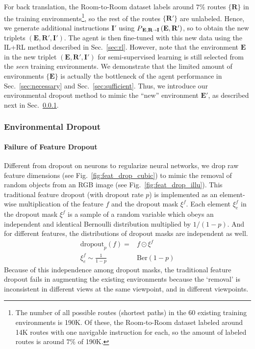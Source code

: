 \documentclass[11pt,a4paper]{article}
\begin{document}
For back translation, the Room-to-Room dataset labels around $7\%$ routes $\{ \mathbf R \}$ in the training environments\footnote{The number of all possible routes (shortest paths) in the $60$ existing training environments is 190K. Of these, the Room-to-Room dataset labeled around 14K routes with one navigable instruction for each, so the amount of labeled routes is around $7\%$ of 190K.}, so the rest of the routes $\{\mathbf{R'}\}$ are unlabeled.
Hence, we generate additional instructions $\mathbf{I'}$ using  $P_{\,\mathbf E, \mathbf R \shortrightarrow \mathbf{I}} \left(\mathbf E, \mathbf{R'} \right)$, so to obtain the new triplets $(\mathbf E, \mathbf{R'}, \mathbf{I'})$. 
The agent is then fine-tuned with this new data using the IL+RL method described in Sec.~\ref{sec:rl}. However, note that the environment $\mathbf E$ in the new triplet $(\mathbf E, \mathbf{R'}, \mathbf{I'})$ for semi-supervised learning is still selected from the \emph{seen} training environments. 
We demonstrate that the limited amount of environments $\{\mathbf E\}$ is actually the bottleneck of the agent performance in  Sec.~\ref{sec:necessary} and Sec.~\ref{sec:sufficient}.
Thus, we introduce our environmental dropout method to mimic the ``new'' environment $\mathbf{E'}$, as described next in Sec.~\ref{sec:env_drop}.



\subsubsection{Environmental Dropout} 
\label{sec:env_drop}
\paragraph{Failure of Feature Dropout}
Different from dropout on neurons to regularize neural networks,
we drop raw feature dimensions (see Fig.~\ref{fig:feat_drop_cubic}) to mimic the removal of random objects from an RGB image (see Fig.~\ref{fig:feat_drop_illu}).
This traditional feature dropout (with dropout rate $p$) is implemented as an element-wise multiplication of the feature $f$ and the dropout mask $\xi^f$.
Each element $\xi^f_e$ in the dropout mask $\xi^f$ is a sample of a random variable which obeys an independent and identical Bernoulli distribution multiplied by $1/(1-p)$.
And for different features, the distributions of dropout masks are independent as well.
\begin{align}
    \mathrm{dropout}_p(f) = & f \odot \xi^f \\
    \xi^f_e  \sim \frac{1}{1-p} & \mathrm{Ber}(1-p) 
\end{align}
Because of this independence among dropout masks, the traditional feature dropout fails in augmenting the existing environments because the `removal' is inconsistent in different views at the same viewpoint, and in different viewpoints. 
\end{document}
